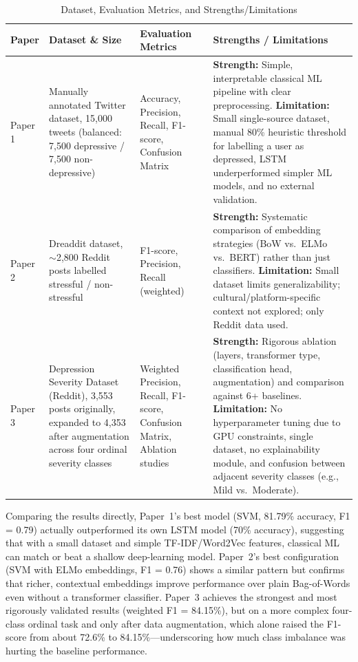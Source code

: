 \documentclass[a4paper,12pt]{article}
\begin{document}
\begin{table}[htbp]
\centering
\caption{Dataset, Evaluation Metrics, and Strengths/Limitations}
\label{tab:evaluation_comparison}
\renewcommand{\arraystretch}{1.3}
\begin{tabularx}{\textwidth}{|p{1.5cm}|X|p{3.2cm}|X|}
\hline
\textbf{Paper} & \textbf{Dataset \& Size} & \textbf{Evaluation Metrics} & \textbf{Strengths / Limitations} \\
\hline

Paper 1 &
Manually annotated Twitter dataset, 15,000 tweets (balanced: 7,500 depressive / 7,500 non-depressive) &
Accuracy, Precision, Recall, F1-score, Confusion Matrix &
\textbf{Strength:} Simple, interpretable classical ML pipeline with clear preprocessing. \textbf{Limitation:} Small single-source dataset, manual 80\% heuristic threshold for labelling a user as depressed, LSTM underperformed simpler ML models, and no external validation. \\
\hline

Paper 2 &
Dreaddit dataset, $\sim$2,800 Reddit posts labelled stressful / non-stressful &
F1-score, Precision, Recall (weighted) &
\textbf{Strength:} Systematic comparison of embedding strategies (BoW vs.\ ELMo vs.\ BERT) rather than just classifiers. \textbf{Limitation:} Small dataset limits generalizability; cultural/platform-specific context not explored; only Reddit data used. \\
\hline

Paper 3 &
Depression Severity Dataset (Reddit), 3,553 posts originally, expanded to 4,353 after augmentation across four ordinal severity classes &
Weighted Precision, Recall, F1-score, Confusion Matrix, Ablation studies &
\textbf{Strength:} Rigorous ablation (layers, transformer type, classification head, augmentation) and comparison against 6+ baselines. \textbf{Limitation:} No hyperparameter tuning due to GPU constraints, single dataset, no explainability module, and confusion between adjacent severity classes (e.g., Mild vs.\ Moderate). \\
\hline

\end{tabularx}
\end{table}

Comparing the results directly, Paper~1's best model (SVM, 81.79\% accuracy, F1 = 0.79) actually outperformed its own LSTM model (70\% accuracy), suggesting that with a small dataset and simple TF-IDF/Word2Vec features, classical ML can match or beat a shallow deep-learning model. Paper~2's best configuration (SVM with ELMo embeddings, F1 = 0.76) shows a similar pattern but confirms that richer, contextual embeddings improve performance over plain Bag-of-Words even without a transformer classifier. Paper~3 achieves the strongest and most rigorously validated results (weighted F1 = 84.15\%), but on a more complex four-class ordinal task and only after data augmentation, which alone raised the F1-score from about 72.6\% to 84.15\%---underscoring how much class imbalance was hurting the baseline performance.
\end{document}

